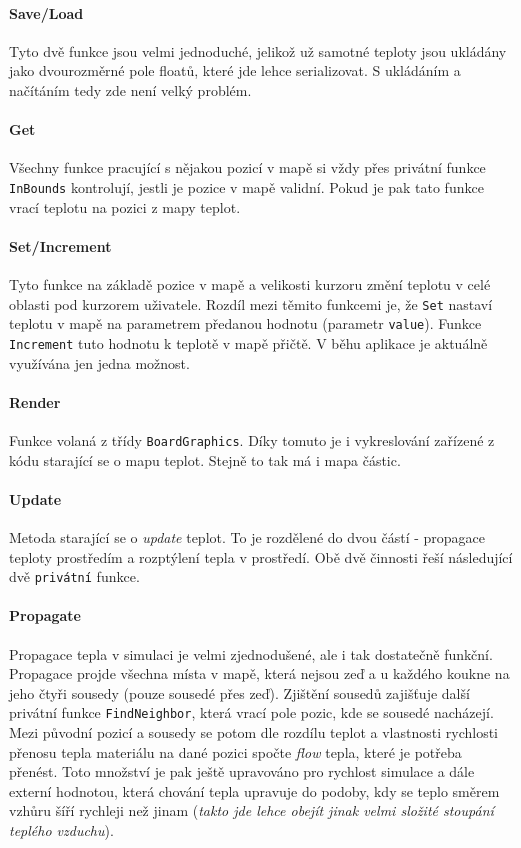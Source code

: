 \documentclass[a4paper, 12pt]{article}
\begin{document}
\paragraph{Save/Load}
Tyto dvě funkce jsou velmi jednoduché, jelikož už samotné teploty jsou ukládány
jako dvourozměrné pole floatů, které jde lehce serializovat. S ukládáním a
načítáním tedy zde není velký problém.

\paragraph{Get}
Všechny funkce pracující s nějakou pozicí v mapě si vždy přes privátní funkce
\texttt{InBounds} kontrolují, jestli je pozice v mapě validní. Pokud je pak
tato funkce vrací teplotu na pozici z mapy teplot.

\paragraph{Set/Increment}
Tyto funkce na základě pozice v mapě a velikosti kurzoru změní teplotu v celé
oblasti pod kurzorem uživatele. Rozdíl mezi těmito funkcemi je, že \texttt{Set}
nastaví teplotu v mapě na parametrem předanou hodnotu (parametr
\texttt{value}). Funkce \texttt{Increment} tuto hodnotu k teplotě v mapě
přičtě. V běhu aplikace je aktuálně využívána jen jedna možnost.

\paragraph{Render}
Funkce volaná z třídy \texttt{BoardGraphics}. Díky tomuto je i vykreslování
zařízené z kódu starající se o mapu teplot. Stejně to tak má i mapa částic.

\paragraph{Update}
Metoda starající se o \emph{update} teplot. To je rozdělené do dvou částí -
propagace teploty prostředím a rozptýlení tepla v prostředí. Obě dvě činnosti
řeší následující dvě \texttt{privátní} funkce.

\paragraph{Propagate}
Propagace tepla v simulaci je velmi zjednodušené, ale i tak dostatečně funkční.
Propagace projde všechna místa v mapě, která nejsou zeď a u každého koukne na
jeho čtyři sousedy (pouze sousedé přes zeď). Zjištění sousedů zajišťuje 
další privátní funkce \texttt{FindNeighbor}, která vrací pole pozic, kde se
sousedé nacházejí. Mezi původní pozicí a sousedy se potom dle rozdílu teplot a
vlastnosti rychlosti přenosu tepla materiálu na dané pozici spočte \emph{flow}
tepla, které je potřeba přenést. Toto množství je pak ještě upravováno pro
rychlost simulace a dále externí hodnotou, která chování tepla upravuje do
podoby, kdy se teplo směrem vzhůru šíří rychleji než jinam (\emph{takto jde
lehce obejít jinak velmi složité stoupání teplého vzduchu}).
\end{document}
